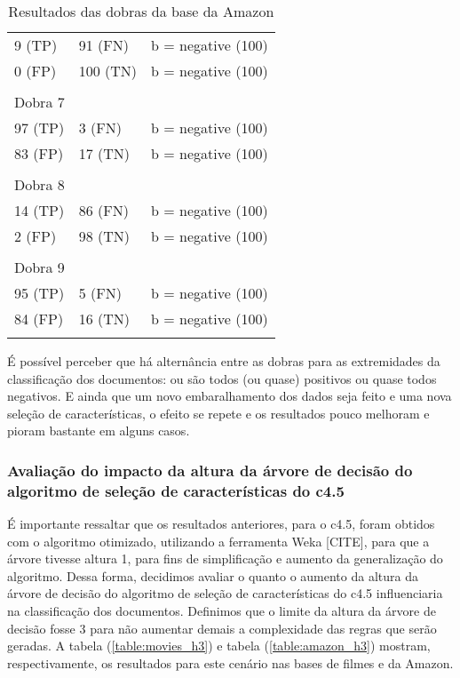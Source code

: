 \begin{table}[!h]
\begin{tabular}{lll}
    9 (TP)    				&91 (FN)      				& b = negative (100) \\
    0 (FP)    				&100 (TN)      				& b = negative (100) \\
	&&\\
	Dobra 7    \\
    97 (TP)    				&3 (FN)      				& b = negative (100) \\
    83 (FP)    				&17 (TN)      				& b = negative (100) \\
	&&\\
	Dobra 8    \\
    14 (TP)    				&86 (FN)      				& b = negative (100) \\
    2 (FP)    				&98 (TN)      				& b = negative (100) \\
	&&\\
	Dobra 9    \\
    95 (TP)    				&5 (FN)      				& b = negative (100) \\
    84 (FP)    				&16 (TN)      				& b = negative (100) \\
	&&\\
    \end{tabular}
    \caption{Resultados das dobras da base da Amazon}
	\label{table:amazon_folds}
\end{table}

É possível perceber que há alternância entre as dobras para as extremidades da classificação dos documentos: ou são todos (ou quase) positivos ou quase todos negativos. E ainda que um novo embaralhamento dos dados seja feito e uma nova seleção de características, o efeito se repete e os resultados pouco melhoram e pioram bastante em alguns casos. 

\subsubsection{Avaliação do impacto da altura da árvore de decisão do algoritmo de seleção de características do c4.5}

É importante ressaltar que os resultados anteriores, para o c4.5, foram obtidos com o algoritmo otimizado, utilizando a ferramenta Weka [CITE], para que a árvore tivesse altura 1, para fins de simplificação e aumento da generalização do algoritmo. Dessa forma, decidimos avaliar o quanto o aumento da altura da árvore de decisão do algoritmo de seleção de características do c4.5 influenciaria na classificação dos documentos. Definimos que o limite da altura da árvore de decisão fosse 3 para não aumentar demais a complexidade das regras que serão geradas. A tabela (\ref{table:movies_h3}) e tabela (\ref{table:amazon_h3}) mostram, respectivamente, os resultados para este cenário nas bases de filmes e da Amazon.

